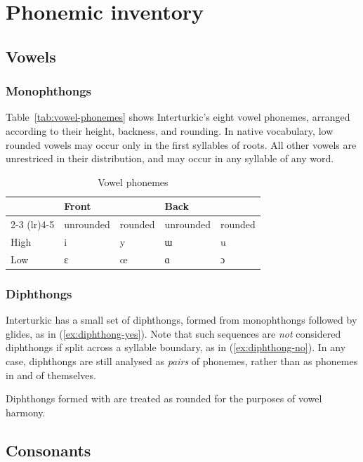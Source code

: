 \chapter{Phonemic inventory}

\section{Vowels}

\subsection{Monophthongs}

Table~\vref{tab:vowel-phonemes} shows Interturkic's eight vowel phonemes,
arranged according to their height, backness, and rounding.
In native vocabulary, low rounded vowels may occur only in the first syllables
of roots.
All other vowels are unrestriced in their distribution, and may occur in any
syllable of any word.

\begin{table}
  \centering
  \caption{Vowel phonemes}
  \label{tab:vowel-phonemes}
  \begin{tabular}{lllll}
    \toprule
    \multirow{2}{*}{} & \multicolumn{2}{l}{Front} & \multicolumn{2}{l}{Back} \\
    \cmidrule(lr){2-3} \cmidrule(lr){4-5}
    & unrounded & rounded & unrounded & rounded \\
    \midrule
    High & i & y & ɯ & u \\
    Low & ɛ & œ & ɑ & ɔ \\
    \bottomrule
  \end{tabular}
\end{table}

\subsection{Diphthongs}

Interturkic has a small set of diphthongs, formed from monophthongs followed by
glides, as in (\vref{ex:diphthong-yes}).
Note that such sequences are \emph{not} considered diphthongs if split across a
syllable boundary, as in (\vref{ex:diphthong-no}).
In any case, diphthongs are still analysed as \emph{pairs} of phonemes, rather
than as phonemes in and of themselves.

\pex
  \a\label{ex:diphthong-yes}%
  \a\label{ex:diphthong-no}%
\xe

Diphthongs formed with  are treated as rounded for the purposes of
vowel harmony.

\section{Consonants}